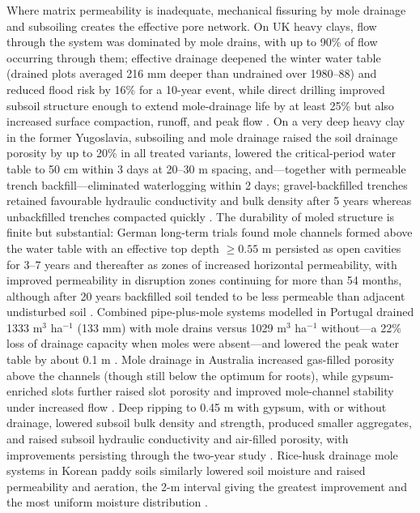 \documentclass[11pt]{article}
\begin{document}
Where matrix permeability is inadequate, mechanical fissuring by mole drainage and
subsoiling creates the effective pore network. On UK heavy clays, flow through the
system was dominated by mole drains, with up to 90\% of flow occurring through them;
effective drainage deepened the winter water table (drained plots averaged 216 mm
deeper than undrained over 1980--88) and reduced flood risk by 16\% for a 10-year
event, while direct drilling improved subsoil structure enough to extend mole-drainage
life by at least 25\% but also increased surface compaction, runoff, and peak flow
\parencite{HARRIS1993}. On a very deep heavy clay in the former Yugoslavia, subsoiling
and mole drainage raised the soil drainage porosity by up to 20\% in all treated
variants, lowered the critical-period water table to 50 cm within 3 days at 20--30 m
spacing, and---together with permeable trench backfill---eliminated waterlogging
within 2 days; gravel-backfilled trenches retained favourable hydraulic conductivity
and bulk density after 5 years whereas unbackfilled trenches compacted quickly
\parencite{PLAMENAC1988}. The durability of moled structure is finite but
substantial: German long-term trials found mole channels formed above the water table
with an effective top depth $\geq 0.55$ m persisted as open cavities for 3--7 years
and thereafter as zones of increased horizontal permeability, with improved
permeability in disruption zones continuing for more than 54 months, although after 20
years backfilled soil tended to be less permeable than adjacent undisturbed soil
\parencite{MULLER1988}. Combined pipe-plus-mole systems modelled in Portugal drained
1333 m$^3$ ha$^{-1}$ (133 mm) with mole drains versus 1029 m$^3$ ha$^{-1}$ without---a
22\% loss of drainage capacity when moles were absent---and lowered the peak water
table by about 0.1 m \parencite{Castanheira2010}. Mole drainage in Australia increased
gas-filled porosity above the channels (though still below the optimum for roots),
while gypsum-enriched slots further raised slot porosity and improved mole-channel
stability under increased flow \parencite{Muirhead1996}. Deep ripping to 0.45 m with
gypsum, with or without drainage, lowered subsoil bulk density and strength, produced
smaller aggregates, and raised subsoil hydraulic conductivity and air-filled porosity,
with improvements persisting through the two-year study \parencite{Greenwood2006}.
Rice-husk drainage mole systems in Korean paddy soils similarly lowered soil moisture
and raised permeability and aeration, the 2-m interval giving the greatest improvement
and the most uniform moisture distribution \parencite{Jung2024}.
\end{document}
